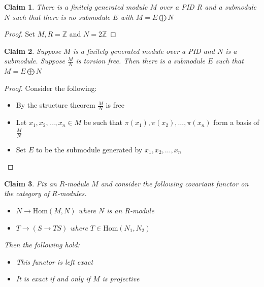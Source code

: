 \documentclass[a4paper,11pt]{article}
\newtheorem{claim}{Claim}
\begin{document}
\begin{claim}
  There is a finitely generated module $M$ over a PID $R$ and a submodule $N$ such that there is no submodule $E$ with $M = E \bigoplus N$
\end{claim}

\begin{proof}
  Set $M,R=\mathbb{Z}$ and $N=2\mathbb{Z}$
\end{proof}

\begin{claim}
  Suppose $M$ is a finitely generated module over a PID and $N$ is a submodule. 
  Suppose $\frac{M}{N}$ is torsion free. Then there is a submodule $E$ such that $M = E \bigoplus N$
\end{claim}

\begin{proof}
  Consider the following:
  \begin{itemize}
    \item By the structure theorem $\frac{M}{N}$ is free
    \item Let $x_1,x_2,\dots,x_n \in M$ be such that $\pi(x_1),\pi(x_2),\dots,\pi(x_n)$ form a basis of $\frac{M}{N}$
    \item Set $E$ to be the submodule generated by $x_1,x_2,\dots,x_n$
  \end{itemize}
\end{proof}

\begin{claim}
  Fix an $R$-module $M$ and consider the following covariant functor on the category of $R$-modules.
  
  \begin{itemize}
    \item $N \to \text{Hom}(M,N)$ where $N$ is an $R$-module
    \item $T \to (S \to TS)$ where $T \in \text{Hom}(N_1,N_2)$
  \end{itemize}
  
  Then the following hold:
  \begin{itemize}
    \item This functor is left exact
    \item It is exact if and only if $M$ is projective
  \end{itemize}

\end{claim}
\end{document}
